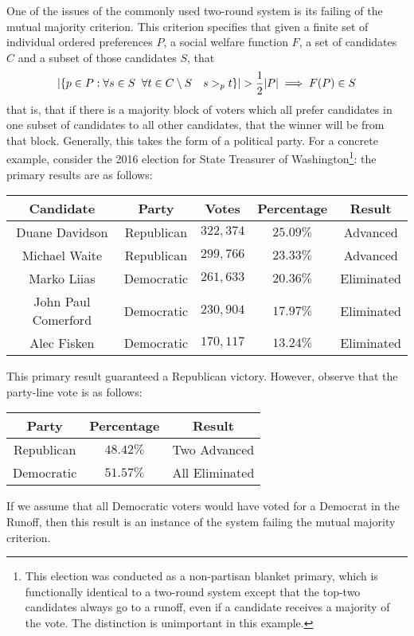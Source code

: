 \documentclass{article}
\begin{document}
One of the issues of the commonly used two-round system is its failing of the mutual majority criterion. This criterion specifies that given a finite set of individual ordered preferences $P$, a social welfare function $F$, a set of candidates $C$ and a subset of those candidates $S$, that 
\[ \abs{\qty{p \in P : \forall s \in S \;\; \forall t \in C\setminus S \quad s >_p t}} > \frac{1}{2}\abs{P} \implies F(P)\in S \]
that is, that if there is a majority block of voters which all prefer candidates in one subset of candidates to all other candidates, that the winner will be from that block. Generally, this takes the form of a political party. For a concrete example, consider the 2016 election for State Treasurer of Washington\footnote{This election was conducted as a non-partisan blanket primary, which is functionally identical to a two-round system except that the top-two candidates always go to a runoff, even if a candidate receives a majority of the vote. The distinction is unimportant in this example.}: the primary results are as follows:
\begin{table}[H]\centering
\begin{tabular}{|c|c|c|c|c|}
\hline\rowcolor{headc}
Candidate & Party & Votes & Percentage & Result\\
\hline\rowcolor{advc}
Duane Davidson & Republican & $322,374$ & $25.09\%$ & Advanced \\
\hline \rowcolor{advc}
Michael Waite & Republican & $299,766$ & $23.33\%$ & Advanced \\
\hline 
Marko Liias & Democratic & $261,633$ & $20.36\%$ & Eliminated \\
\hline 
John Paul Comerford & Democratic & $230,904$ & $17.97\%$ & Eliminated\\
\hline 
Alec Fisken & Democratic & $170,117$ & $13.24\%$ & Eliminated\\
\hline
\end{tabular}
\label{2016tr}
\end{table}
This primary result guaranteed a Republican victory. However, observe that the party-line vote is as follows:
\begin{table}[H]\centering
\begin{tabular}{|c|c|c|}
\hline\rowcolor{headc}
Party & Percentage & Result\\
\hline\rowcolor{advc}
Republican & $48.42\%$ & Two Advanced\\
\hline
Democratic & $51.57\%$ & All Eliminated\\
\hline
\end{tabular}\end{table}
If we assume that all Democratic voters would have voted for a Democrat in the Runoff, then this result is an instance of the system failing the mutual majority criterion.
\end{document}
